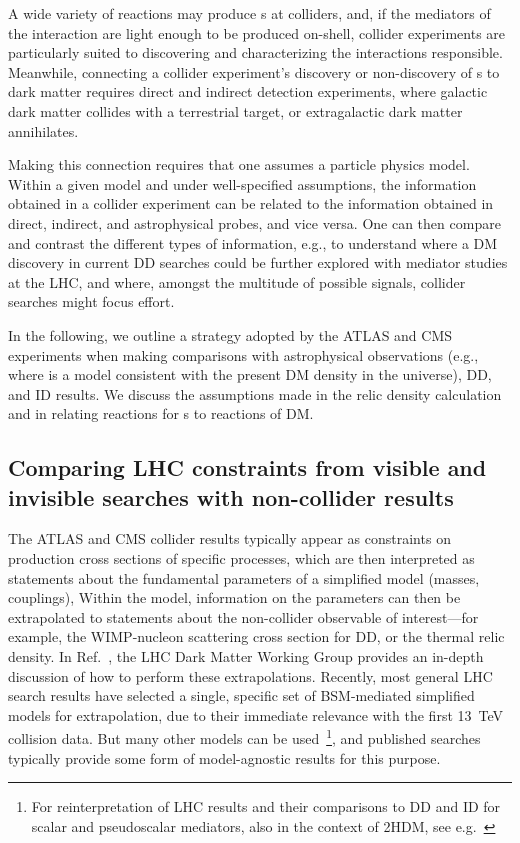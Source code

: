 A wide variety of reactions may produce {\IP}s at colliders, and, if the mediators of the interaction are light enough to be produced on-shell, collider experiments are particularly suited to discovering and characterizing the interactions responsible.  Meanwhile, connecting a collider experiment's discovery or non-discovery of {\IP}s to dark matter requires direct and indirect detection experiments, where galactic dark matter collides with a terrestrial target, or extragalactic dark matter annihilates.

Making this connection requires that one assumes a particle physics model.
Within a given model and under well-specified assumptions, the information obtained in a collider experiment can be related to the information obtained in direct, indirect, and astrophysical probes, and vice versa.
One can then compare and contrast the different types of information, e.g., to understand where a DM discovery in current DD searches could be further explored with mediator studies at the LHC, and where, amongst the multitude of possible signals, collider searches might focus effort.

In the following, we outline a strategy adopted by the ATLAS and CMS experiments when making comparisons with astrophysical observations (e.g., where is a model consistent with the present DM density in the universe), DD, and ID results. We discuss the assumptions made in the relic density calculation and in relating reactions for {\IP}s to reactions of DM.

\subsection{Comparing LHC constraints from visible and invisible searches with non-collider results}

The ATLAS and CMS collider results typically appear as constraints on production cross sections of specific processes, which are then interpreted as statements about the fundamental parameters of a simplified model (masses, couplings), Within the model, information on the parameters can then be extrapolated to statements about the non-collider observable of interest---for example, the WIMP-nucleon scattering cross section for DD, or the thermal relic density.
In Ref.~\cite{Boveia:2016mrp}, the LHC Dark Matter Working Group provides an in-depth discussion of how to perform these extrapolations.
Recently, most general LHC search results have selected a single, specific set of BSM-mediated simplified models for extrapolation, due to their immediate relevance with the first 13~TeV collision data. But many other models can be used~\footnote{For reinterpretation of LHC results and their comparisons to DD and ID for scalar and pseudoscalar mediators, also in the context of 2HDM, see e.g.~\cite{Athron:2017kgt,Banerjee:2017wxi,Bell:2016ekl}}, and published searches typically provide some form of model-agnostic results for this purpose.


